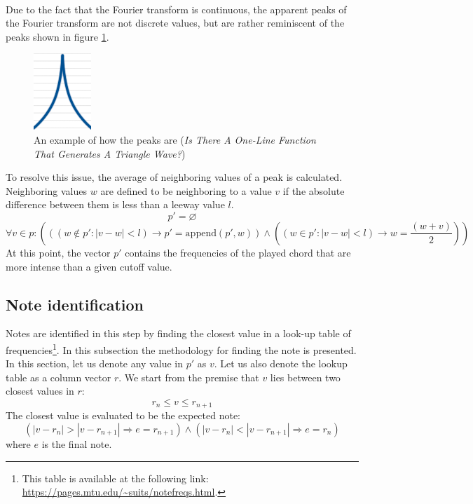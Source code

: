 \documentclass{article}
\providecommand{\abs}[1]{\lvert#1\rvert}
\begin{document}
\paragraph*{} 
Due to the fact that the Fourier transform is continuous, the apparent peaks of
the Fourier transform are not discrete values, but are rather reminiscent of
the peaks shown in figure \ref{fig:conc-triang}.
\begin{figure}[ht]
	\centering
	\includegraphics[width=0.1 \textwidth]{img/conv-triangle}
	\caption{An example of how the peaks are (\textit{Is There A One-Line
		Function That Generates A Triangle Wave?})}
	\label{fig:conc-triang}
\end{figure}

To resolve this issue, the average of neighboring values of a peak is
calculated.  Neighboring values $w$ are defined to be neighboring to a value
$v$ if the absolute difference between them is less than a leeway value $l$.
$$p' = \varnothing$$
$$\forall v \in p : \left( 
	\left( \left( w \not\in p' : \abs{v - w} < l \right) \rightarrow p' =
		\text{append}\left( p', w \right) 
	\right) \land
	\left( \left( w \in p' : \abs{v - w} < l \right) \rightarrow
	w = \frac{(w + v)}{2}
	\right)
\right)$$
At this point, the vector $p'$ contains the frequencies of the played chord 
that are more intense than a given cutoff value.

\subsection{Note identification}
Notes are identified in this step by finding the closest value in a look-up 
table of frequencies\footnote{This table is available at the following link: 
\url{https://pages.mtu.edu/~suits/notefreqs.html}.}. In this subsection the
methodology for finding the note is presented. In this section, let us denote
any value in $p'$ as $v$. Let us also denote the lookup table as a column
vector $r$. We start from the premise that $v$ lies between two closest values
in $r$:
$$r_n \leq v \leq r_{n+1}$$
The closest value is evaluated to be the expected note:
$$\left( | v - r_n | > | v - r_{n+1} | \Rightarrow e = r_{n+1} \right) \land
\left( | v - r_n | < | v - r_{n+1} | \Rightarrow e = r_{n} \right)$$
where $e$ is the final note.
\end{document}
